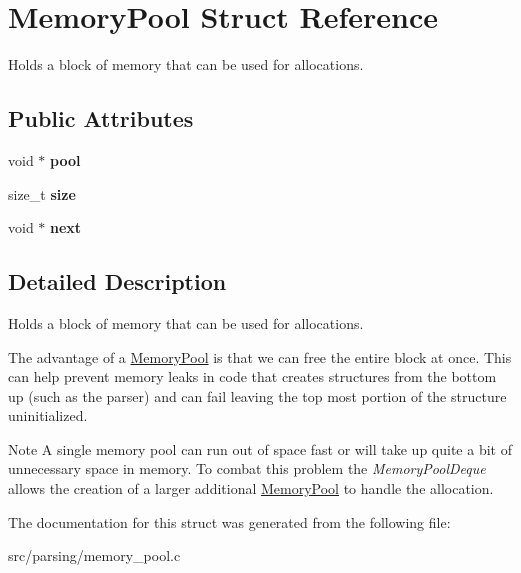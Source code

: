 \hypertarget{structMemoryPool}{}\section{Memory\+Pool Struct Reference}
\label{structMemoryPool}


Holds a block of memory that can be used for allocations.  


\subsection*{Public Attributes}
\begin{DoxyCompactItemize}
\item 
\mbox{\label{structMemoryPool_aac9222b12332558fb831f4b9b4400763}} 
void $\ast$ {\bfseries pool}
\item 
\mbox{\label{structMemoryPool_af554fe1d65607ebfd49e195db299b827}} 
size\+\_\+t {\bfseries size}
\item 
\mbox{\label{structMemoryPool_af5fd87a1dc44d4e5ea496d403c426d92}} 
void $\ast$ {\bfseries next}
\end{DoxyCompactItemize}


\subsection{Detailed Description}
Holds a block of memory that can be used for allocations. 

The advantage of a \hyperlink{structMemoryPool}{Memory\+Pool} is that we can free the entire block at once. This can help prevent memory leaks in code that creates structures from the bottom up (such as the parser) and can fail leaving the top most portion of the structure uninitialized.

\begin{DoxyNote}{Note}
A single memory pool can run out of space fast or will take up quite a bit of unnecessary space in memory. To combat this problem the {\itshape Memory\+Pool\+Deque} allows the creation of a larger additional \hyperlink{structMemoryPool}{Memory\+Pool} to handle the allocation. 
\end{DoxyNote}


The documentation for this struct was generated from the following file\+:\begin{DoxyCompactItemize}
\item 
src/parsing/memory\+\_\+pool.\+c\end{DoxyCompactItemize}
